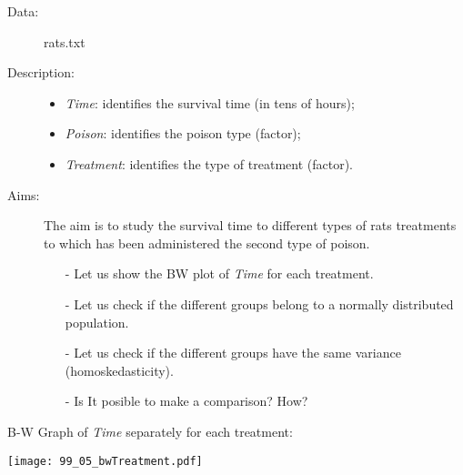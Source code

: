 \begin{frame}
  \begin{description}
    \item[Data: ]rats.txt \\ 
    \item[Description: ]
      \begin{footnotesize}
        \begin{itemize}
          \item \textit{Time}: identifies the survival time (in tens of hours);
          \item \textit{Poison}: identifies the poison type (factor);
          \item \textit{Treatment}: identifies the type of treatment (factor).
        \end{itemize}
      \end{footnotesize}
    \item[Aims: ]
      \begin{footnotesize}
        The aim is to study the survival time to different types of rats treatments to which has been administered the second type of poison.  
        \begin{itemize}
          \item[-] Let us show the BW plot of \textit{Time} for each treatment.
          \item[-] Let us check if the different groups belong to a normally distributed population.
          \item[-] Let us check if the different groups have the same variance (homoskedasticity).
          \item[-] Is It posible to make a comparison? How?
        \end{itemize}
      \end{footnotesize}
  \end{description}
\end{frame}

\begin{frame}
  B-W Graph of \textit{Time} separately for each treatment:\\
  \vspace{-0.5cm}
  \begin{center}
    \texttt{[image: 99\_05\_bwTreatment.pdf]}
  \end{center}
\end{frame}

